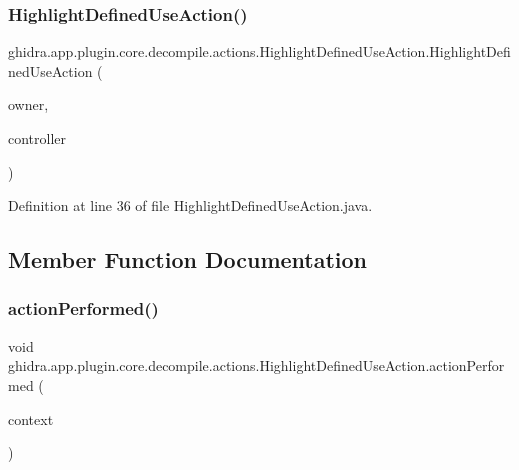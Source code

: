 \subsubsection{\texorpdfstring{HighlightDefinedUseAction()}{HighlightDefinedUseAction()}}
{\footnotesize\ttfamily ghidra.\+app.\+plugin.\+core.\+decompile.\+actions.\+Highlight\+Defined\+Use\+Action.\+Highlight\+Defined\+Use\+Action (\begin{DoxyParamCaption}\item[{String}]{owner,  }\item[{\mbox{\hyperlink{classghidra_1_1app_1_1decompiler_1_1component_1_1_decompiler_controller}{Decompiler\+Controller}}}]{controller }\end{DoxyParamCaption})\hspace{0.3cm}{\ttfamily [inline]}}



Definition at line 36 of file Highlight\+Defined\+Use\+Action.\+java.



\subsection{Member Function Documentation}
\mbox{\label{classghidra_1_1app_1_1plugin_1_1core_1_1decompile_1_1actions_1_1_highlight_defined_use_action_a65cdffc68c8e31b8a97aa59ad6f0183c}} 
\subsubsection{\texorpdfstring{actionPerformed()}{actionPerformed()}}
{\footnotesize\ttfamily void ghidra.\+app.\+plugin.\+core.\+decompile.\+actions.\+Highlight\+Defined\+Use\+Action.\+action\+Performed (\begin{DoxyParamCaption}\item[{Action\+Context}]{context }\end{DoxyParamCaption})\hspace{0.3cm}{\ttfamily [inline]}}



